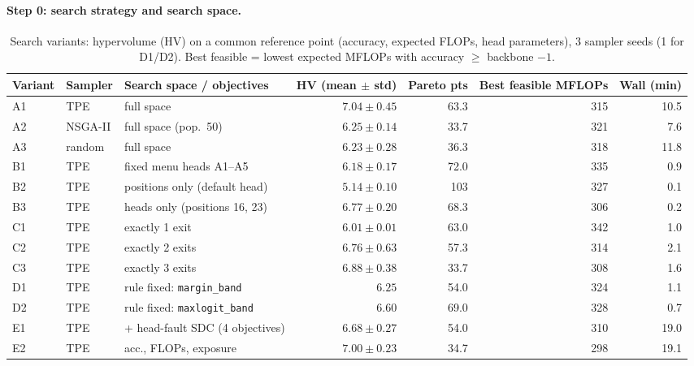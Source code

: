 \documentclass[10pt,a4paper]{article}
\newcommand{\meth}[1]{\texttt{#1}}
\newcommand{\ours}{\meth{margin\_band}}
\begin{document}
\paragraph{Step 0: search strategy and search space.}

\begin{table}[H]
\centering\small
\setlength{\tabcolsep}{4pt}
\caption{Search variants: hypervolume (HV) on a common reference point (accuracy, expected FLOPs, head
parameters), 3 sampler seeds (1 for D1/D2). Best feasible = lowest expected MFLOPs with accuracy
$\ge$ backbone $-1$.}
\label{tab:nas}
\begin{adjustbox}{max width=\linewidth}
\begin{tabular}{@{}lllrrrr@{}}
\toprule
Variant & Sampler & Search space / objectives & HV (mean $\pm$ std) & Pareto pts & Best feasible MFLOPs & Wall (min) \\
\midrule
A1 & TPE       & full space                      & $\mathbf{7.04\pm0.45}$ & 63.3 & 315 & 10.5 \\
A2 & NSGA-II   & full space (pop.\ 50)           & $6.25\pm0.14$ & 33.7 & 321 & 7.6 \\
A3 & random    & full space                      & $6.23\pm0.28$ & 36.3 & 318 & 11.8 \\
B1 & TPE       & fixed menu heads A1--A5         & $6.18\pm0.17$ & 72.0 & 335 & 0.9 \\
B2 & TPE       & positions only (default head)   & $5.14\pm0.10$ & 103  & 327 & 0.1 \\
B3 & TPE       & heads only (positions 16, 23)   & $6.77\pm0.20$ & 68.3 & 306 & 0.2 \\
C1 & TPE       & exactly 1 exit                  & $6.01\pm0.01$ & 63.0 & 342 & 1.0 \\
C2 & TPE       & exactly 2 exits                 & $6.76\pm0.63$ & 57.3 & 314 & 2.1 \\
C3 & TPE       & exactly 3 exits                 & $6.88\pm0.38$ & 33.7 & 308 & 1.6 \\
D1 & TPE       & rule fixed: \ours               & $6.25$        & 54.0 & 324 & 1.1 \\
D2 & TPE       & rule fixed: \meth{maxlogit\_band} & $6.60$      & 69.0 & 328 & 0.7 \\
E1 & TPE       & + head-fault SDC (4 objectives) & $6.68\pm0.27$ & 54.0 & 310 & 19.0 \\
E2 & TPE       & acc., FLOPs, exposure           & $7.00\pm0.23$ & 34.7 & 298 & 19.1 \\
\bottomrule
\end{tabular}
\end{adjustbox}
\end{table}
\end{document}
